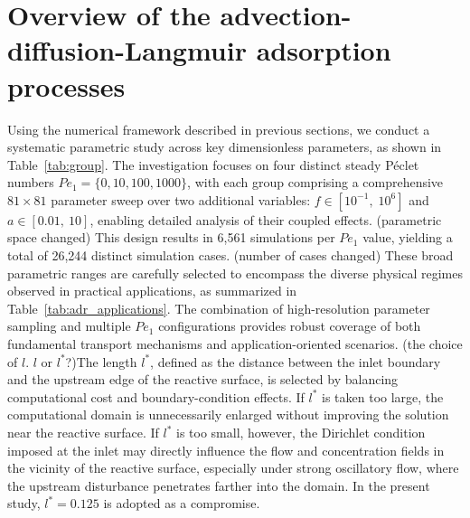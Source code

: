 \documentclass[lineno]{JFM-FLM_Au}
\begin{document}



\section{\label{sec:results}Overview of the advection-diffusion-Langmuir adsorption processes}


{\color{blue}

Using the numerical framework described in previous sections, we conduct a systematic parametric study across key dimensionless parameters, as shown in Table~\ref{tab:group}. The investigation focuses on four distinct steady P\'{e}clet numbers $Pe_1 = \{0, 10, 100, 1000\}$, with each group comprising a comprehensive $81 \times 81$ parameter sweep over two additional variables: $f \in [10^{-1},\;10^{6}] $ and $a \in [0.01,\ 10]$, enabling detailed analysis of their coupled effects. {\color{magenta}(parametric space changed)} This design results in 6,561 simulations per $Pe_1$ value, yielding a total of 26,244 distinct simulation cases. {\color{magenta}(number of cases changed)} These broad parametric ranges are carefully selected to encompass the diverse physical regimes observed in practical applications, as summarized in Table~\ref{tab:adr_applications}. The combination of high-resolution parameter sampling and multiple $Pe_1$ configurations provides robust coverage of both fundamental transport mechanisms and application-oriented scenarios.
{\color{magenta}(the choice of $l$. $l$ or $l^*$?)}{\color{brown}The length $l^*$, defined as the distance between the inlet boundary and the upstream edge of the reactive surface, is selected by balancing computational cost and boundary-condition effects. If $l^*$ is taken too large, the computational domain is unnecessarily enlarged without improving the solution near the reactive surface. If $l^*$ is too small, however, the Dirichlet condition imposed at the inlet may directly influence the flow and concentration fields in the vicinity of the reactive surface, especially under strong oscillatory flow, where the upstream disturbance penetrates farther into the domain. In the present study, $l^* = 0.125$ is adopted as a compromise.}


}
\end{document}
